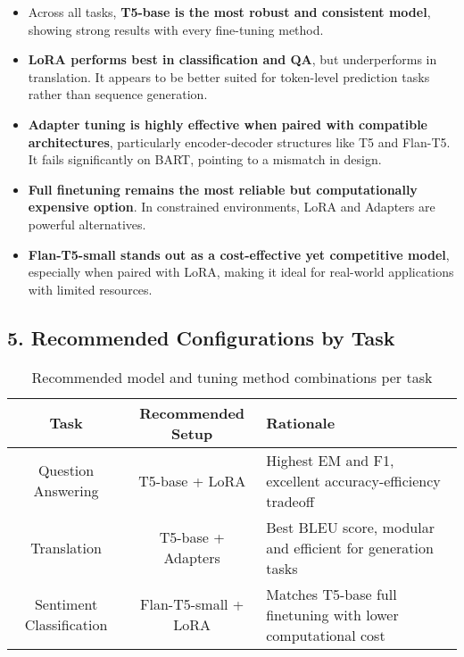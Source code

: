 \begin{itemize}
    \item Across all tasks, \textbf{T5-base is the most robust and consistent model}, showing strong results with every fine-tuning method.
    
    \item \textbf{LoRA performs best in classification and QA}, but underperforms in translation. It appears to be better suited for token-level prediction tasks rather than sequence generation.
    
    \item \textbf{Adapter tuning is highly effective when paired with compatible architectures}, particularly encoder-decoder structures like T5 and Flan-T5. It fails significantly on BART, pointing to a mismatch in design.
    
    \item \textbf{Full finetuning remains the most reliable but computationally expensive option}. In constrained environments, LoRA and Adapters are powerful alternatives.
    
    \item \textbf{Flan-T5-small stands out as a cost-effective yet competitive model}, especially when paired with LoRA, making it ideal for real-world applications with limited resources.
\end{itemize}

\subsection*{5. Recommended Configurations by Task}

\begin{table}[h!]
\centering
\begin{tabular}{|c|c|p{8cm}|}
\hline
\textbf{Task} & \textbf{Recommended Setup} & \textbf{Rationale} \\
\hline
Question Answering & T5-base + LoRA & Highest EM and F1, excellent accuracy-efficiency tradeoff \\
\hline
Translation & T5-base + Adapters & Best BLEU score, modular and efficient for generation tasks \\
\hline
Sentiment Classification & Flan-T5-small + LoRA & Matches T5-base full finetuning with lower computational cost \\
\hline
\end{tabular}
\caption{Recommended model and tuning method combinations per task}
\end{table}

\newpage
